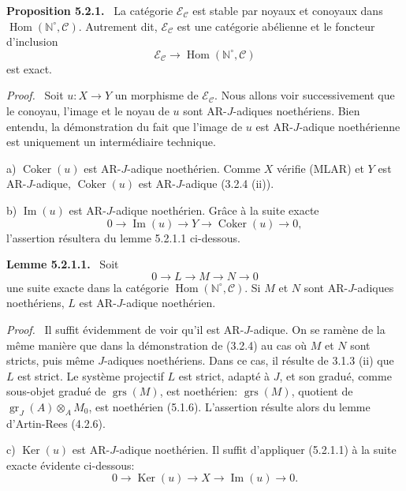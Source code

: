 \documentclass[11pt]{article}
\newenvironment{statement}[1]{\par\medskip\noindent\textbf{#1.}\ }{\par\medskip}
\newenvironment{prooftext}[1][Proof]{\par\noindent\emph{#1.}\ }{\par\medskip}
\DeclareMathOperator{\Hom}{Hom}
\providecommand{\Ker}{\operatorname{Ker}}
\providecommand{\Coker}{\operatorname{Coker}}
\providecommand{\gr}{\operatorname{gr}}
\providecommand{\Hom}{\operatorname{Hom}}
\providecommand{\Im}{\operatorname{Im}}
\providecommand{\Ker}{\operatorname{Ker}}
\providecommand{\Coker}{\operatorname{Coker}}
\providecommand{\gr}{\operatorname{gr}}
\renewcommand{\Im}{\operatorname{Im}}
\providecommand{\gr}{\operatorname{gr}}
\providecommand{\grs}{\operatorname{grs}}
\providecommand{\Ker}{\operatorname{Ker}}
\providecommand{\Coker}{\operatorname{Coker}}
\providecommand{\Im}{\operatorname{Im}}
\providecommand{\Hom}{\operatorname{Hom}}
\begin{document}
\begin{statement}{Proposition 5.2.1}
La catégorie \(\mathcal E_{\mathcal C}\) est stable par noyaux et conoyaux dans \(\Hom(\mathbb N^\circ,\mathcal C)\). Autrement dit, \(\mathcal E_{\mathcal C}\) est une catégorie abélienne et le foncteur d'inclusion
\[
\mathcal E_{\mathcal C}\longrightarrow \Hom(\mathbb N^\circ,\mathcal C)
\]
est exact.
\end{statement}

\begin{prooftext}
Soit \(u:X\to Y\) un morphisme de \(\mathcal E_{\mathcal C}\). Nous allons voir successivement que le conoyau, l'image et le noyau de \(u\) sont AR-\(J\)-adiques noethériens. Bien entendu, la démonstration du fait que l'image de \(u\) est AR-\(J\)-adique noethérienne est uniquement un intermédiaire technique.

a) \(\Coker(u)\) est AR-\(J\)-adique noethérien. Comme \(X\) vérifie (MLAR) et \(Y\) est AR-\(J\)-adique, \(\Coker(u)\) est AR-\(J\)-adique (3.2.4 (ii)).

b) \(\Im(u)\) est AR-\(J\)-adique noethérien. Grâce à la suite exacte
\[
0\longrightarrow \Im(u)\longrightarrow Y\longrightarrow \Coker(u)\longrightarrow 0,
\]
l'assertion résultera du lemme 5.2.1.1 ci-dessous.
\end{prooftext}

\begin{statement}{Lemme 5.2.1.1}
Soit
\[
0\longrightarrow L\longrightarrow M\longrightarrow N\longrightarrow0
\]
une suite exacte dans la catégorie \(\Hom(\mathbb N^\circ,\mathcal C)\). Si \(M\) et \(N\) sont AR-\(J\)-adiques noethériens, \(L\) est AR-\(J\)-adique noethérien.
\end{statement}

\begin{prooftext}
Il suffit évidemment de voir qu'il est AR-\(J\)-adique. On se ramène de la même manière que dans la démonstration de (3.2.4) au cas où \(M\) et \(N\) sont stricts, puis même \(J\)-adiques noethériens. Dans ce cas, il résulte de 3.1.3 (ii) que \(L\) est strict. Le système projectif \(L\) est strict, adapté à \(J\), et son gradué, comme sous-objet gradué de \(\grs(M)\), est noethérien: \(\grs(M)\), quotient de \(\gr_J(A)\otimes_A M_0\), est noethérien (5.1.6). L'assertion résulte alors du lemme d'Artin-Rees (4.2.6).
\end{prooftext}

c) \(\Ker(u)\) est AR-\(J\)-adique noethérien. Il suffit d'appliquer (5.2.1.1) à la suite exacte évidente ci-dessous:
\[
0\longrightarrow \Ker(u)\longrightarrow X\longrightarrow \Im(u)\longrightarrow0.
\]
\end{document}
